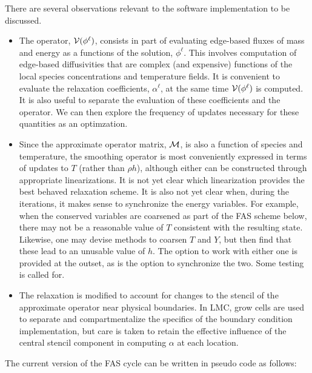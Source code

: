 \documentclass[11pt]{article}
\begin{document}
There are several observations relevant to the software implementation to be discussed.
\begin{itemize}
\item The operator, ${\cal V}({\phi}^{\ell})$, consists in part of
  evaluating edge-based fluxes of mass and energy as a functions of
  the solution, ${\phi}^{\ell}$.  This involves computation of
  edge-based diffusivities that are complex (and expensive) functions
  of the local species concentrations and temperature fields.  It is
  convenient to evaluate the relaxation coefficients,
  ${\alpha}^{\ell}$, at the same time ${\cal V}({\phi}^{\ell})$ is
  computed.  It is also useful to separate the evaluation of these
  coefficients and the operator.  We can then explore the frequency of
  updates necessary for these quantities as an optimzation.
\item Since the approximate operator matrix, ${\cal M}$, is also a
  function of species and temperature, the smoothing operator is most
  conveniently expressed in terms of updates to $T$ (rather than
  $\rho h$), although either can be constructed through appropriate
  linearizations.  It is not yet clear which linearization provides
  the best behaved relaxation scheme.  It is also not yet clear when,
  during the iterations, it makes sense to synchronize the energy
  variables.  For example, when the conserved variables are coarsened
  as part of the FAS scheme below, there may not be a reasonable value
  of $T$ consistent with the resulting state.  Likewise, one may
  devise methods to coarsen $T$ and $Y$, but then find that these lead
  to an unusable value of $h$.  The option to work with either one is
  provided at the outset, as is the option to synchronize the two.
  Some testing is called for.
\item The relaxation is modified to account for changes to the stencil
  of the approximate operator near physical boundaries.  In LMC, grow
  cells are used to separate and compartmentalize the specifics of the
  boundary condition implementation, but care is taken to retain the
  effective influence of the central stencil component in computing
  $\alpha$ at each location.
\end{itemize}

\newpage
The current version of the FAS cycle can be written in pseudo code as follows:
\end{document}
